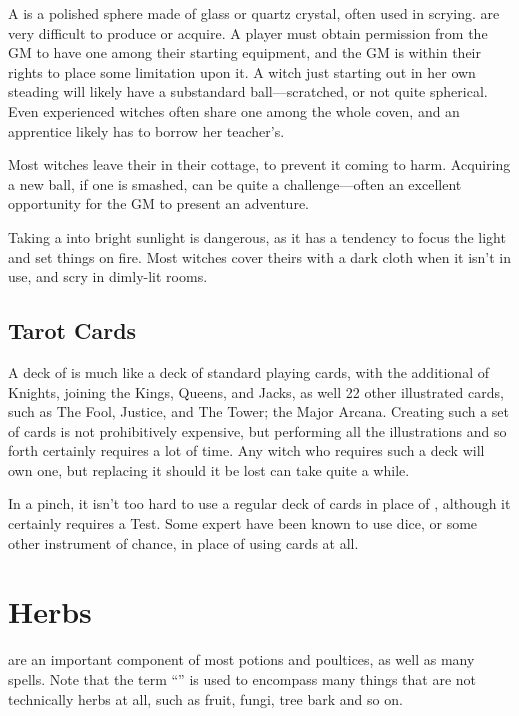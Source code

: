 A  is a polished sphere made of glass or quartz crystal, often used in scrying.
 are very difficult to produce or acquire.
A player must obtain permission from the GM to have one among their starting equipment, and the GM is within their rights to place some limitation upon it.
A witch just starting out in her own steading will likely have a substandard ball---scratched, or not quite spherical.
Even experienced witches often share one among the whole coven, and an apprentice likely has to borrow her teacher's.

Most witches leave their  in their cottage, to prevent it coming to harm.
Acquiring a new ball, if one is smashed, can be quite a challenge---often an excellent opportunity for the GM to present an adventure.

Taking a  into bright sunlight is dangerous, as it has a tendency to focus the light and set things on fire.
Most witches cover theirs with a dark cloth when it isn't in use, and scry in dimly-lit rooms.

\subsection{Tarot Cards}

A deck of  is much like a deck of standard playing cards, with the additional of Knights, joining the Kings, Queens, and Jacks, as well 22 other illustrated cards, such as The Fool, Justice, and The Tower; the Major Arcana.
Creating such a set of cards is not prohibitively expensive, but performing all the illustrations and so forth certainly requires a lot of time.
Any witch who requires such a deck will own one, but replacing it should it be lost can take quite a while.

In a pinch, it isn't too hard to use a regular deck of cards in place of , although it certainly requires a Test.
Some expert  have been known to use dice, or some other instrument of chance, in place of using cards at all.

\section{Herbs}

 are an important component of most potions and poultices, as well as many spells.
Note that the term ``'' is used to encompass many things that are not technically herbs at all, such as fruit, fungi, tree bark and so on.


